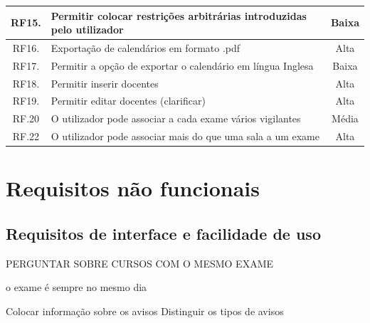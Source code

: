 \documentclass[11pt, twoside]{report}
\begin{document}
\begin{table}
\begin{center}
\begin{tabularx}{\textwidth}{|c|X|c|}
				\hline
				RF15. & Permitir colocar restrições arbitrárias introduzidas pelo utilizador & Baixa \\
				\hline
				RF16. & Exportação de calendários em formato .pdf & Alta \\
				\hline
				RF17. & Permitir a opção de exportar o calendário em língua Inglesa & Baixa \\
				\hline
				RF18. & Permitir inserir docentes &Alta\\
				\hline
				RF19. & Permitir editar docentes (clarificar) & Alta\\
				\hline
				RF.20 &O utilizador pode associar a cada exame vários vigilantes&Média\\
				\hline
				RF.22 &	O utilizador pode associar mais do que uma sala a um exame&Alta\\
				\hline
			\end{tabularx}
	\end{center}
\end{table}

	
	\section{Requisitos não funcionais}
	\subsection{Requisitos de interface e facilidade de uso}
	PERGUNTAR SOBRE CURSOS COM O MESMO EXAME
	
	o exame é sempre no mesmo dia
	
	
	Colocar informação sobre os avisos
	Distinguir os tipos de avisos
	
	
	
\end{document}
